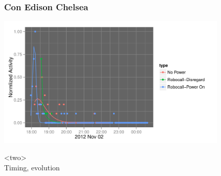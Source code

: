 \documentclass{beamer}
\begin{document}
\begin{frame}\frametitle{Con Edison Chelsea}
  \begin{center}
    \includegraphics[width=11cm]{./imgs/fake_fit2.pdf}
  \end{center}
\end{frame}

%


\begin{frame}
\begin{center}
{\Huge <two> \\ [15pt] Timing, evolution}
\end{center}
\end{frame}

%
\end{document}
